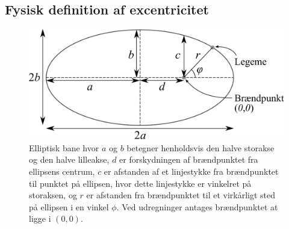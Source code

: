 \subsection{Fysisk definition af excentricitet}
\begin{figure}[h!]
	\centering
	\includegraphics[scale=0.45]{Planetbevaegelse/Ellipse.pdf}
	\caption{Elliptisk bane hvor $a$ og $b$ betegner henholdsvis den halve storakse og den halve lilleakse, $d$ er forskydningen af brændpunktet fra ellipsens centrum, $c$ er afstanden af et linjestykke fra brændpunktet til punktet på ellipsen, hvor dette linjestykke er vinkelret på storaksen, og $r$ er afstanden fra brændpunktet til et virkårligt sted på ellipsen i en vinkel $\phi$. Ved udregninger antages brændpunktet at ligge i $(0,0)$.}
	\label{fig:Ellipse}
\end{figure}

